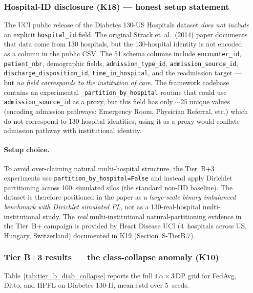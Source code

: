 \documentclass[conference]{IEEEtran}
\begin{document}
\subsubsection*{Hospital-ID disclosure (K18) --- honest setup statement}

The UCI public release of the Diabetes 130-US Hospitals dataset \emph{does not include} an explicit \texttt{hospital\_id} field. The original Strack et~al.\ (2014) paper documents that data come from 130 hospitals, but the 130-hospital identity is not encoded as a column in the public CSV. The 51 schema columns include \texttt{encounter\_id}, \texttt{patient\_nbr}, demographic fields, \texttt{admission\_type\_id}, \texttt{admission\_source\_id}, \texttt{discharge\_disposition\_id}, \texttt{time\_in\_hospital}, and the readmission target --- but \emph{no field corresponds to the institution of care}. The framework codebase contains an experimental \texttt{\_partition\_by\_hospital} routine that could use \texttt{admission\_source\_id} as a proxy, but this field has only $\sim$25 unique values (encoding admission pathways: Emergency Room, Physician Referral, etc.) which do not correspond to 130 hospital identities; using it as a proxy would conflate admission pathway with institutional identity.

\paragraph{Setup choice.} To avoid over-claiming natural multi-hospital structure, the Tier~B+3 experiments use \texttt{partition\_by\_hospital{=}False} and instead apply Dirichlet partitioning across 100~simulated silos (the standard non-IID baseline). The dataset is therefore positioned in the paper as a \emph{large-scale binary imbalanced benchmark with Dirichlet simulated FL}, not as a 130-real-hospital multi-institutional study. The \emph{real} multi-institutional natural-partitioning evidence in the Tier~B+ campaign is provided by Heart Disease UCI (4~hospitals across US, Hungary, Switzerland) documented in K19 (Section~S-TierB.7).

\subsubsection*{Tier B+3 results --- the class-collapse anomaly (K10)}

Table~\ref{tab:tier_b_diab_collapse} reports the full $4\,\alpha \times 3\,\text{DP}$ grid for FedAvg, Ditto, and HPFL on Diabetes 130-H, mean$\pm$std over 5~seeds.
\end{document}
